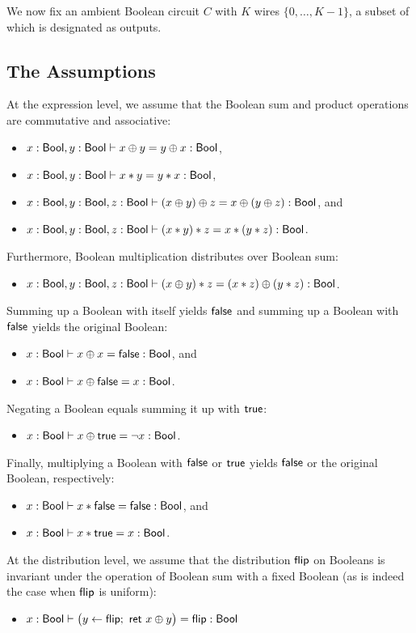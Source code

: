\noindent We now fix an ambient Boolean circuit $C$ with $K$ wires $\{0,\ldots,K-1\}$, a subset of which is designated as outputs.

\subsection{The Assumptions}
At the expression level, we assume that the Boolean sum and product operations are commutative and associative:
\begin{itemize}
\item $x : \mathsf{Bool}, y : \mathsf{Bool} \vdash x \oplus y = y \oplus x : \mathsf{Bool}$,
\item $x : \mathsf{Bool}, y : \mathsf{Bool} \vdash x * y = y * x : \mathsf{Bool}$,
\item $x : \mathsf{Bool}, y : \mathsf{Bool}, z : \mathsf{Bool} \vdash (x \oplus y) \oplus z = x \oplus (y \oplus z) : \mathsf{Bool}$, and
\item $x : \mathsf{Bool}, y : \mathsf{Bool}, z : \mathsf{Bool} \vdash (x * y) * z = x * (y * z) : \mathsf{Bool}$.
\end{itemize}
Furthermore, Boolean multiplication distributes over Boolean sum:
\begin{itemize}
\item $x : \mathsf{Bool}, y : \mathsf{Bool}, z : \mathsf{Bool} \vdash (x \oplus y) * z = (x * z) \oplus (y * z) : \mathsf{Bool}$.
\end{itemize}
Summing up a Boolean with itself yields $\mathsf{false}$ and summing up a Boolean with $\mathsf{false}$ yields the original Boolean:
\begin{itemize}
\item $x : \mathsf{Bool} \vdash x \oplus x = \mathsf{false} : \mathsf{Bool}$, and
\item $x : \mathsf{Bool} \vdash x \oplus \mathsf{false} = x : \mathsf{Bool}$.
\end{itemize}
Negating a Boolean equals summing it up with $\mathsf{true}$:
\begin{itemize}
\item $x : \mathsf{Bool} \vdash x \oplus \mathsf{true} = \neg x : \mathsf{Bool}$.
\end{itemize}
Finally, multiplying a Boolean with $\mathsf{false}$ or $\mathsf{true}$ yields $\mathsf{false}$ or the original Boolean, respectively:
\begin{itemize}
\item $x : \mathsf{Bool} \vdash x * \mathsf{false} = \mathsf{false} : \mathsf{Bool}$, and
\item $x : \mathsf{Bool} \vdash x * \mathsf{true} = x : \mathsf{Bool}$.
\end{itemize}
At the distribution level, we assume that the distribution $\mathsf{flip}$ on Booleans is invariant under the operation of Boolean sum with a fixed Boolean (as is indeed the case when $\mathsf{flip}$ is uniform):
\begin{itemize}
\item $x : \mathsf{Bool} \vdash \big(y \leftarrow \mathsf{flip}; \ \mathsf{ret} \ x \oplus y\big) = \mathsf{flip} : \mathsf{Bool}$
\end{itemize}

